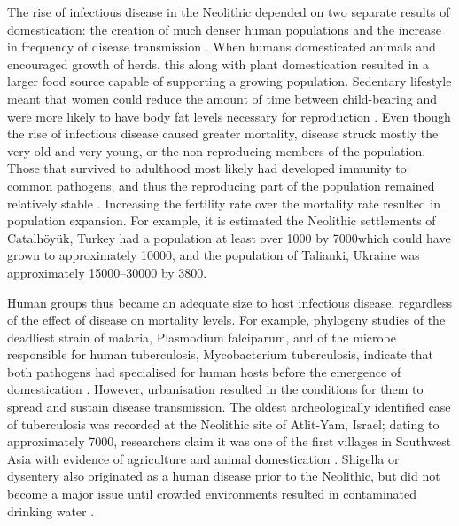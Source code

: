 The  rise of infectious disease in the Neolithic depended on two separate results of domestication: the creation of much denser human populations and the increase in frequency of disease transmission \parencite[703--704]{Diamond_2002}. 
When humans domesticated animals and encouraged growth of herds, this along with plant domestication resulted in a larger food source capable of supporting a growing population. Sedentary lifestyle meant that women could reduce the amount of time between 
child-bearing and were more likely to have body fat levels 
necessary for reproduction \parencites[333]{Lee_1980}{Wilmsen_1989}. 
Even though the rise of infectious disease caused greater mortality, 
disease struck mostly the very old and very young, or the non-reproducing 
members of the population. Those that survived to adulthood most likely
 had developed immunity to common pathogens, and thus the reproducing 
part of the population remained relatively stable \parencite[18]{Armelagos_1991}. 
Increasing the fertility rate over the mortality rate resulted in population expansion. 
For example, it is estimated the Neolithic settlements of Catalhöyük, Turkey 
had a population at least over \num{1000} by 7000\BC which could have grown to approximately \num{10000}, 
and the population of Talianki, Ukraine was approximately \num{15000}--\num{30000} by 3800\BC \parencites{Hodder_2011}{Kohl_2009}. 

Human groups thus became an adequate size to host infectious disease, regardless of the effect of disease on mortality levels. 
For example, phylogeny studies of the deadliest strain of malaria, Plasmodium falciparum, and of the microbe responsible for human tuberculosis, 
Mycobacterium tuberculosis, indicate that both pathogens had specialised for human hosts before the emergence of domestication \parencite[373--374]{Pearce-Duvet_2006}. 
However, urbanisation resulted in the conditions for them to spread and sustain disease transmission. The oldest archeologically identified case of tuberculosis was recorded at the Neolithic site of Atlit-Yam, Israel; 
dating to approximately 7000\BC, researchers claim it was one of the first villages in Southwest Asia with evidence of agriculture and animal domestication \parencite{Hershkovitz_2008}. 
Shigella or dysentery also originated as a human disease prior to the Neolithic, 
but did not become a major issue until crowded environments resulted in contaminated 
drinking water \parencite[119]{Diamond_1987}. 

